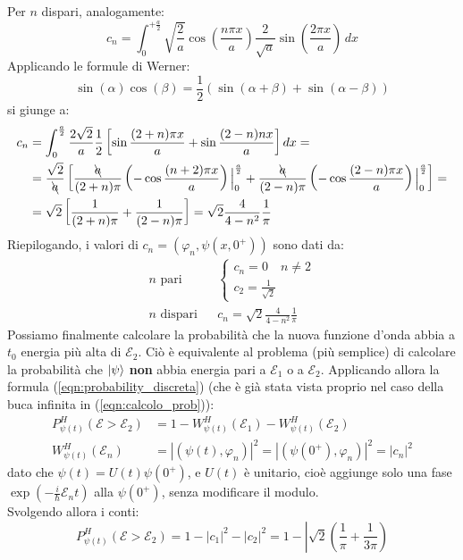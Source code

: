 \documentclass[../../FisicaTeorica.tex]{subfiles}
\begin{document}
\begin{enumerate}
Per $n$ dispari, analogamente:
\[
c_n=\int_0^{+\frac{a}{2}} \sqrt{\frac{2}{a}}\cos\left(\frac{n\pi x}{a}\right)\frac{2}{\sqrt{a}}\sin\left(\frac{2\pi x}{a}\right)\,dx
\]
Applicando le formule di Werner:
\[
\sin(\alpha) \cos (\beta) = \frac{1}{2}\left(\sin(\alpha+\beta)+\sin(\alpha-\beta)\right)
\]
si giunge a:
\begin{align*}
c_n &= \int_0^{\frac{a}{2}}\frac{2\sqrt{2}}{a}\frac{1}{2}\left[\sin\frac{(2+n)\pi x}{a}+\sin\frac{(2-n)n x}{a}\right]dx =\\
&= \frac{\sqrt{2}}{\bcancel{a}}\left[ \frac{\bcancel{a}}{(2+n)\pi}\left(-\cos \frac{(n+2)\pi x}{a}\right)\Big|_{0}^{\frac{a}{2}}+\frac{\bcancel{a}}{(2-n)\pi}\left(-\cos\frac{(2-n)\pi x}{a}\right)\Big|_{0}^{\frac{a}{2}} \right] =\\
&=\sqrt{2}\left[\frac{1}{(2+n)\pi} + \frac{1}{(2-n)\pi}\right]=\sqrt{2}\frac{4}{4-n^2}\frac{1}{\pi}
\end{align*}
Riepilogando, i valori di $c_n=(\varphi_n, \psi(x,0^+))$ sono dati da:
\begin{align*}
\text{$n$ pari} && \begin{cases}
c_n = 0 \quad n \neq 2\\
c_2 = \frac{1}{\sqrt{2}}
\end{cases}\\
\text{$n$ dispari} && c_n=\sqrt{2}\frac{4}{4-n^2}\frac{1}{\pi}
\end{align*}
Possiamo finalmente calcolare la probabilità che la nuova funzione d'onda abbia a $t_0$ energia più alta di $\mathcal{E}_2$. Ciò è equivalente al problema (più semplice) di calcolare la probabilità che $\Ket{\psi}$ \textbf{non} abbia energia pari a $\mathcal{E}_1$ o a $\mathcal{E}_2$. Applicando allora la formula (\ref{eqn:probability_discreta}) (che è già stata vista proprio nel caso della buca infinita in (\ref{eqn:calcolo_prob})):
\begin{align*}
P^H_{\psi(t)}(\mathcal{E}>\mathcal{E}_2)&=1-W^H_{\psi(t)}(\mathcal{E}_1)-W^H_{\psi(t)}(\mathcal{E}_2)\\
W^H_{\psi(t)}(\mathcal{E}_n) &= |(\psi(t),\varphi_n)|^2 = |(\psi(0^+),\varphi_n)|^2 = |c_n|^2
\end{align*}
dato che $\psi(t)=U(t)\psi(0^+)$, e $U(t)$ è unitario, cioè aggiunge solo una fase $\exp\left(-\frac{i}{\hbar}\mathcal{E}_n t\right)$ alla $\psi(0^+)$, senza modificare il modulo.\\
Svolgendo allora i conti:
\[
P_{\psi(t)}^H(\mathcal{E}>\mathcal{E}_2)=1-|c_1|^2-|c_2|^2=1-\left|\sqrt{2}\left(\frac{1}{\pi}+\frac{1}{3\pi}\right)
\]
\end{enumerate}
\end{document}
